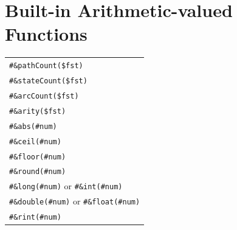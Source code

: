 \documentclass[letterpaper,12pt]{article}
\begin{document}
\section{Built-in Arithmetic-valued Functions}

\begin{tabular}{|l|}
\hline
\verb!#&pathCount($fst)! \\
\verb!#&stateCount($fst)! \\
\verb!#&arcCount($fst)! \\
\verb!#&arity($fst)! \\
\hline
\verb!#&abs(#num)! \\
\verb!#&ceil(#num)! \\
\verb!#&floor(#num)! \\
\verb!#&round(#num)! \\
\hline
\verb!#&long(#num)! or \verb!#&int(#num)! \\
\verb!#&double(#num)! or \verb!#&float(#num)! \\
\verb!#&rint(#num)! \\
\hline
\end{tabular}

\newpage


\end{document}
